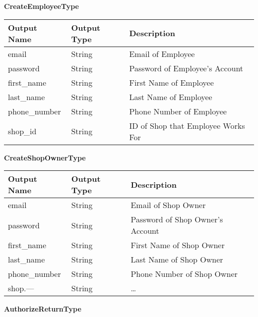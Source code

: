 \documentclass[12pt, titlepage]{article}
\begin{document}
\textbf{CreateEmployeeType}

\begin{table}[H]
	\begin{tabular}{|l|l|l|}
		\hline
		\textbf{Output Name} & \textbf{Output Type} & \textbf{Description}               \\
		\hline
		email                & String               & Email of Employee                  \\
		\hline
		password             & String               & Password of Employee's Account     \\
		\hline
		first\_name          & String               & First Name of Employee             \\
		\hline
		last\_name           & String               & Last Name of Employee              \\
		\hline
		phone\_number        & String               & Phone Number of Employee           \\
		\hline
		shop\_id             & String               & ID of Shop that Employee Works For \\
		\hline
	\end{tabular}
\end{table}

\textbf{CreateShopOwnerType}

\begin{table}[H]
	\begin{tabular}{|l|l|l|}
		\hline
		\textbf{Output Name} & \textbf{Output Type} & \textbf{Description}             \\
		\hline
		email                & String               & Email of Shop Owner              \\
		\hline
		password             & String               & Password of Shop Owner's Account \\
		\hline
		first\_name          & String               & First Name of Shop Owner         \\
		\hline
		last\_name           & String               & Last Name of Shop Owner          \\
		\hline
		phone\_number        & String               & Phone Number of Shop Owner       \\
		\hline
		shop.---             & String               & \dots                            \\
		\hline
	\end{tabular}
\end{table}

\textbf{AuthorizeReturnType}
\end{document}
